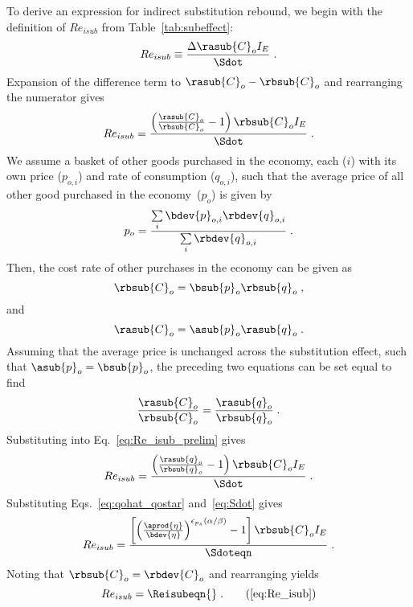 To derive an expression for indirect substitution rebound, 
we begin with the definition of $Re_{isub}$ 
from Table~\ref{tab:subeffect}:
%
\begin{equation} \label{eq:Re_isub_dev}
  Re_{isub} \equiv \frac{\Delta \rasub{C}_o I_E}{\Sdot} \; .
\end{equation}
%
Expansion of the difference term to $\rasub{C}_o - \rbsub{C}_o$ and rearranging the numerator gives
%
\begin{equation} \label{eq:Re_isub_prelim}
  Re_{isub} = \frac{\left( \frac{\rasub{C}_o}{\rbsub{C}_o} - 1  \right) \rbsub{C}_o I_E} {\Sdot} \; .
\end{equation}
%
We assume a basket of other goods purchased in the economy, 
each ($i$) with its own price ($p_{o,i}$) and rate of consumption ($q_{o,i}$), 
such that the average price of all other good purchased in the economy~($p_o$) is given by
%
\begin{equation}
  p_o = \frac{\sum\limits_i \bdev{p}_{o,i} \rbdev{q}_{o,i}}{\sum\limits_i \rbdev{q}_{o,i}} \; .
\end{equation}
%
Then, the cost rate of other purchases in the economy can be given as
%
\begin{equation}
  \rbsub{C}_o = \bsub{p}_o \rbsub{q}_o \; ,
\end{equation}
%
and
%
\begin{equation}
  \rasub{C}_o = \asub{p}_o \rasub{q}_o \; .
\end{equation}
%
Assuming that the average price is unchanged across the substitution effect, 
such that $\asub{p}_o = \bsub{p}_o$, 
the preceding two equations can be set equal to find
%
\begin{equation}
  \frac{\rasub{C}_o}{\rbsub{C}_o} = \frac{\rasub{q}_o}{\rbsub{q}_o} \; .
\end{equation}
%
Substituting into Eq.~\ref{eq:Re_isub_prelim} gives
%
\begin{equation}
  Re_{isub} = \frac{\left( \frac{\rasub{q}_o}{\rbsub{q}_o} - 1  \right) \rbsub{C}_o I_E} {\Sdot} \; .
\end{equation}
Substituting Eqs.~\ref{eq:qohat_qostar} and~\ref{eq:Sdot} gives
%
\begin{equation}
  Re_{isub} = \frac{\left[ \left(\frac{\aprod{\eta}}{\bdev{\eta}} \right)
                  ^{\epsilon_{p_s} (\alpha / \beta )} - 1  \right] \rbsub{C}_o I_E}
                  {\Sdoteqn} \; .
\end{equation}
%
Noting that $\rbsub{C}_o = \rbdev{C}_o$ and rearranging yields
%
\begin{equation}
  Re_{isub} = \Reisubeqn{} \; . \tag{\ref{eq:Re_isub}}
\end{equation}


